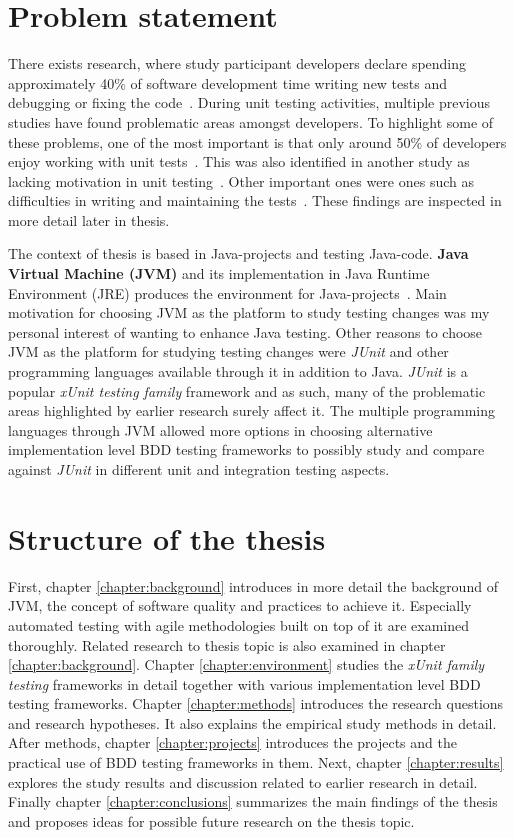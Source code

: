 \section{Problem statement}
There exists research, where study participant developers declare spending approximately 40\% of software development time
writing new tests and debugging or fixing the code~\cite{daka2014survey}. During unit testing activities, multiple previous
studies have found problematic areas amongst developers. To highlight some of these problems, one of the most important is
that only around 50\% of developers enjoy working with unit tests~\cite{daka2014survey}. This was also
identified in another study as lacking motivation in unit testing~\cite{runeson2006survey}. Other important ones
were ones such as difficulties in writing and maintaining the tests~\cite{daka2014survey}. These findings are inspected
in more detail later in thesis.

The context of thesis is based in Java-projects and testing Java-code. \textbf{Java Virtual Machine (JVM)} and its
implementation in Java Runtime Environment (JRE) produces the environment for Java-projects~\cite{wiki:jvm}.
Main motivation for choosing JVM as the platform to study testing changes was my personal interest of wanting to enhance
Java testing.
Other reasons to choose JVM as the platform for studying testing changes were \textit{JUnit} and other programming
languages available through it in addition to Java. \textit{JUnit} is a popular \textit{xUnit testing family} framework and as such,
many of the problematic areas highlighted by earlier research surely affect it. The multiple programming languages through JVM
allowed more options in choosing alternative implementation level BDD testing frameworks to possibly study and compare
against \textit{JUnit} in different unit and integration testing aspects.



\section{Structure of the thesis}
First, chapter \ref{chapter:background} introduces in more detail the background of JVM, the concept of software quality and practices to achieve it.
Especially automated testing with agile methodologies built on top of it are examined thoroughly. Related research to thesis topic is also
examined in chapter \ref{chapter:background}. Chapter \ref{chapter:environment} studies the \textit{xUnit family testing} frameworks
in detail together with various implementation level BDD testing frameworks. Chapter \ref{chapter:methods} introduces
the research questions and research hypotheses. It also explains the empirical study methods in detail.
After methods, chapter \ref{chapter:projects} introduces the projects and the practical use of BDD testing frameworks in them.
Next, chapter \ref{chapter:results} explores the study results and discussion related to earlier research in detail.
Finally chapter \ref{chapter:conclusions} summarizes the main findings of the thesis and proposes ideas for possible
future research on the thesis topic.
